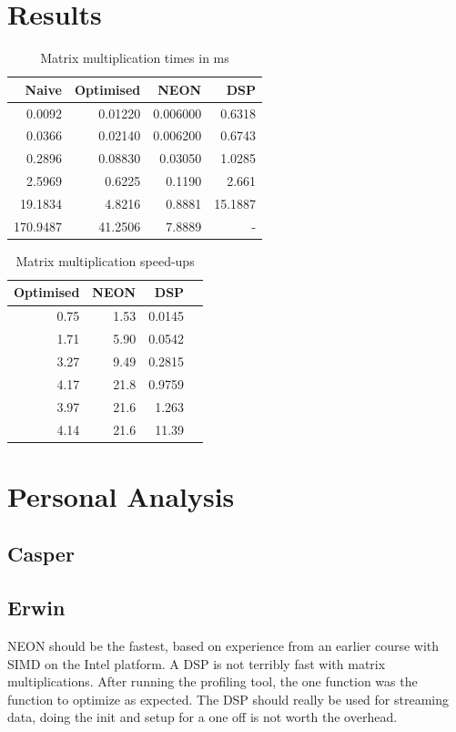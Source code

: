 \documentclass[final]{article} %
\begin{document}
\begin{appendices}
\section{Results}\label{app:results}
\begin{table}[H]
\centering
\caption{Matrix multiplication times in ms}
\label{tab:results}
\begin{tabular}{rrrr}
\toprule
Naive & Optimised & NEON & DSP \\
\midrule
	0.0092 & 0.01220 & 0.006000 & 0.6318\\
	0.0366 & 0.02140 & 0.006200 & 0.6743\\
	0.2896 & 0.08830 & 0.03050 & 1.0285\\
	2.5969 & 0.6225 & 0.1190 & 2.661\\
	19.1834 & 4.8216 & 0.8881 & 15.1887\\
	170.9487 & 41.2506 & 7.8889 & - \\
\bottomrule
\end{tabular}
\end{table}

\begin{table}[H]
\centering
\caption{Matrix multiplication speed-ups}
\label{tab:results}
\begin{tabular}{rrrr}
\toprule
Optimised & NEON & DSP \\
\midrule
0.75 & 1.53 & 0.0145 \\
1.71 & 5.90 & 0.0542 \\
3.27 & 9.49 & 0.2815 \\
4.17 & 21.8 & 0.9759 \\
3.97 & 21.6 & 1.263 \\
4.14 & 21.6 & 11.39 \\
\bottomrule
\end{tabular}
\end{table}

\section{Personal Analysis}\label{app:appendix-personal-analysis}

\subsection{Casper}

\subsection{Erwin}
NEON should be the fastest, based on experience from an earlier course with SIMD on the Intel platform.
A DSP is not terribly fast with matrix multiplications.
After running the profiling tool, the one function was the function to optimize as expected.
The DSP should really be used for streaming data, doing the init and setup for a one off is not worth the overhead.


\end{appendices}
\end{document}
